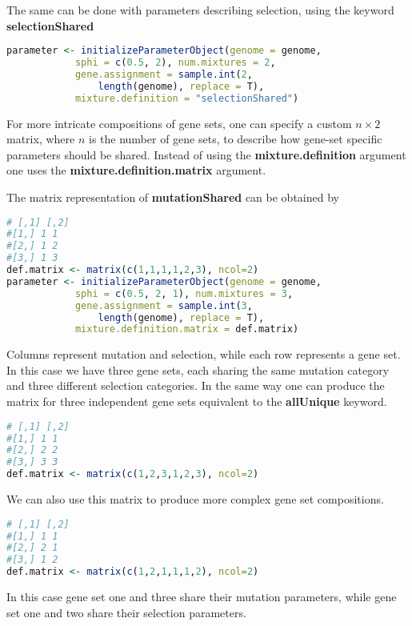 The same can be done with parameters describing selection, using the keyword \textbf{selectionShared}

\begin{lstlisting}[language=R]
parameter <- initializeParameterObject(genome = genome, 
			sphi = c(0.5, 2), num.mixtures = 2,
			gene.assignment = sample.int(2, 
				length(genome), replace = T),
			mixture.definition = "selectionShared")
\end{lstlisting}

For more intricate compositions of gene sets, one can specify a custom $n \times 2$ matrix, where $n$ is the number of gene sets, to describe how gene-set specific parameters should be shared. 
Instead of using the \textbf{mixture.definition} argument one uses the \textbf{mixture.definition.matrix} argument.

The matrix representation of \textbf{mutationShared} can be obtained by

\begin{lstlisting}[language=R]
# [,1] [,2]
#[1,] 1 1
#[2,] 1 2
#[3,] 1 3
def.matrix <- matrix(c(1,1,1,1,2,3), ncol=2)
parameter <- initializeParameterObject(genome = genome, 
			sphi = c(0.5, 2, 1), num.mixtures = 3,
			gene.assignment = sample.int(3, 
				length(genome), replace = T),
			mixture.definition.matrix = def.matrix)
\end{lstlisting}

Columns represent mutation and selection, while each row represents a gene set. 
In this case we have three gene sets, each sharing the same mutation category and three different selection categories.
In the same way one can produce the matrix for three independent gene sets equivalent to the \textbf{allUnique} keyword.

\begin{lstlisting}[language=R]
# [,1] [,2]
#[1,] 1 1
#[2,] 2 2
#[3,] 3 3
def.matrix <- matrix(c(1,2,3,1,2,3), ncol=2)
\end{lstlisting}

We can also use this matrix to produce more complex gene set compositions.

\begin{lstlisting}[language=R]
# [,1] [,2]
#[1,] 1 1
#[2,] 2 1
#[3,] 1 2
def.matrix <- matrix(c(1,2,1,1,1,2), ncol=2)
\end{lstlisting}

In this case gene set one and three share their mutation parameters, while gene set one and two share their selection parameters.


